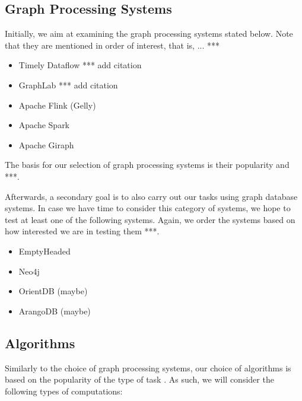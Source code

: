 \documentclass[a4paper,11pt]{article}
\begin{document}
\subsection{Graph Processing Systems} \label{graph-proc}

\par Initially, we aim at examining the graph processing systems stated below. Note that they are mentioned in order of interest, that is, ... ***

\begin{itemize}

	\item Timely Dataflow *** add citation
	\item GraphLab *** add citation
	\item Apache Flink (Gelly) \cite{flink}
	\item Apache Spark \cite{spark}
	\item Apache Giraph \cite{giraph}

\end{itemize}

\par The basis for our selection of graph processing systems is their popularity \cite{survey} and ***.

\medskip

\par Afterwards, a secondary goal is to also carry out our tasks using graph database systems. In case we have time to consider this category of systems, we hope to test at least one of the following systems. Again, we order the systems based on how interested we are in testing them ***.

\begin{itemize}

	\item EmptyHeaded \cite{emptyheaded} \cite{emptyheadedgit}
	\item Neo4j \cite{neo4j}
	\item OrientDB \cite{orientdb} (maybe)
	\item ArangoDB \cite{arangodb} (maybe)

\end{itemize}

\subsection{Algorithms} \label{algos}

\par Similarly to the choice of graph processing systems, our choice of algorithms is based on the popularity of the type of task \cite{survey}. As such, we will consider the following types of computations:
\end{document}
